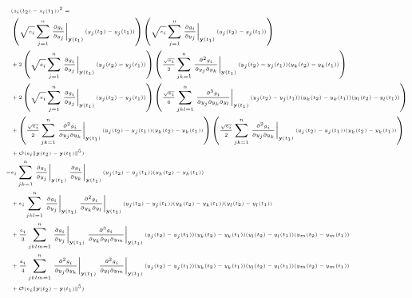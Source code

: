 \begin{equation}
\tiny
\begin{aligned}
& (z_i(t_2) - z_i(t_1))^2 = \\ 
& \left( \sqrt{e_i} \sum_{j=1}^n \left. \frac{\partial g_i}{\partial y_j} \right|_{\mathbf{y}(t_1)} (y_j(t_2)-y_j(t_1)) \right) \left( \sqrt{e_i} \sum_{j=1}^n \left. \frac{\partial g_i}{\partial y_j} \right|_{\mathbf{y}(t_1)} (y_j(t_2)-y_j(t_1)) \right) \\
&+ 2 \left( \sqrt{e_i} \sum_{j=1}^n \left. \frac{\partial g_i}{\partial y_j} \right|_{\mathbf{y}(t_1)} (y_j(t_2)-y_j(t_1)) \right) \left( \frac{\sqrt{e_i}}{2} \sum_{jk=1}^n \left. \frac{\partial^2 g_i}{\partial y_j \partial y_k} \right|_{\mathbf{y}(t_1)} (y_j(t_2)-y_j(t_1)) (y_k(t_2)-y_k(t_1)) \right) \\
&+ 2 \left( \sqrt{e_i} \sum_{j=1}^n \left. \frac{\partial g_i}{\partial y_j} \right|_{\mathbf{y}(t_1)} (y_j(t_2)-y_j(t_1)) \right) \left( \frac{\sqrt{e_i}}{6} \sum_{jkl=1}^n \left. \frac{\partial^3 g_i}{\partial y_j \partial y_k \partial y_l} \right|_{\mathbf{y}(t_1)} (y_j(t_2)-y_j(t_1)) (y_k(t_2)-y_k(t_1)) (y_l(t_2)-y_l(t_1)) \right) \\
&+ \left( \frac{\sqrt{e_i}}{2} \sum_{jk=1}^n \left. \frac{\partial^2 g_i}{\partial y_j \partial y_k} \right|_{\mathbf{y}(t_1)} (y_j(t_2)-y_j(t_1)) (y_k(t_2)-y_k(t_1)) \right) \left( \frac{\sqrt{e_i}}{2} \sum_{jk=1}^n \left. \frac{\partial^2 g_i}{\partial y_j \partial y_k} \right|_{\mathbf{y}(t_1)} (y_j(t_2)-y_j(t_1)) (y_k(t_2)-y_k(t_1)) \right) \\
&+ \mathcal{O}( e_i \|\mathbf{y}(t_2) - \mathbf{y}(t_1) \|^5) \\
=& e_i \sum_{jk=1}^n \left. \frac{\partial g_i}{\partial y_j} \right|_{\mathbf{y}(t_1)} \left. \frac{\partial g_i}{\partial y_k} \right|_{\mathbf{y}(t_1)} (y_j(t_2)-y_j(t_1)) (y_k(t_2)-y_k(t_1)) \\
&+ e_i \sum_{jkl=1}^n \left. \frac{\partial g_i}{\partial y_j} \right|_{\mathbf{y}(t_1)} \left. \frac{\partial^2 g_i}{\partial y_k \partial y_l} \right|_{\mathbf{y}(t_1)} (y_j(t_2)-y_j(t_1))  (y_k(t_2)-y_k(t_1)) (y_l(t_2)-y_l(t_1)) \\
&+ \frac{e_i}{3} \sum_{jklm=1}^n \left. \frac{\partial g_i}{\partial y_j} \right|_{\mathbf{y}(t_1)} \left. \frac{\partial^3 g_i}{ \partial y_k \partial y_l \partial y_m} \right|_{\mathbf{y}(t_1)} (y_j(t_2)-y_j(t_1)) (y_k(t_2)-y_k(t_1)) (y_l(t_2)-y_l(t_1))(y_m(t_2)-y_m(t_1)) \\
&+ \frac{e_i}{4} \sum_{jklm=1}^n \left. \frac{\partial^2 g_i}{\partial y_j \partial y_k} \right|_{\mathbf{y}(t_1)} \left. \frac{\partial^2 g_i}{\partial y_l \partial y_m} \right|_{\mathbf{y}(t_1)} (y_j(t_2)-y_j(t_1)) (y_k(t_2)-y_k(t_1)) (y_l(t_2)-y_l(t_1)) (y_m(t_2)-y_m(t_1)) \\
&+ \mathcal{O}(e_i \|\mathbf{y}(t_2) - \mathbf{y}(t_1) \|^5)
\end{aligned}
\end{equation}
